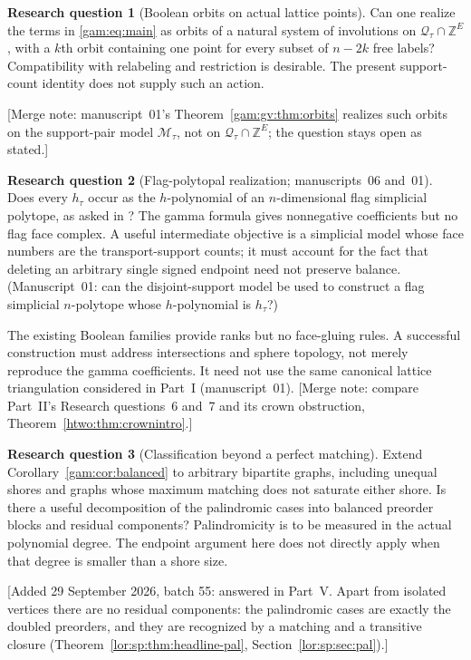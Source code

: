 \documentclass[11pt]{article}
\numberwithin{equation}{section}
\theoremstyle{definition}
\newtheorem{question}{Research question}%
\newcommand{\Z}{\mathbb Z}
\newcommand{\Qt}{\mathcal Q_\tau}
\begin{document}
\begin{question}[Boolean orbits on actual lattice points]\label{gam:q:orbits}
Can one realize the terms in \eqref{gam:eq:main} as orbits of a natural system
of involutions on $\Qt\cap\Z^E$, with a $k$th orbit containing one point
for every subset of $n-2k$ free labels? Compatibility with relabeling and
restriction is desirable. The present support-count identity does not
supply such an action.
\end{question}
[Merge note: manuscript~01's Theorem~\ref{gam:gv:thm:orbits} realizes such
orbits on the support-pair model $\mathscr M_\tau$, not on $\Qt\cap\Z^E$;
the question stays open as stated.]

\begin{question}[Flag-polytopal realization; manuscripts~06 and~01]\label{gam:q:flag}
Does every $h_\tau$ occur as the $h$-polynomial of an $n$-dimensional flag
simplicial polytope, as asked in \cite[Conjecture~5.1(d)]{AC}? The gamma
formula gives nonnegative coefficients but no flag face complex. A useful
intermediate objective is a simplicial model whose face numbers are the
transport-support counts; it must account for the fact that deleting an
arbitrary single signed endpoint need not preserve balance. (Manuscript~01:
can the disjoint-support model be used to construct a flag simplicial
$n$-polytope whose $h$-polynomial is $h_\tau$?)
\end{question}
The existing Boolean families provide ranks but no face-gluing rules.
A successful construction must address intersections and sphere topology,
not merely reproduce the gamma coefficients. It need not use the same
canonical lattice triangulation considered in Part~I (manuscript~01).
[Merge note: compare Part~II's Research questions~6 and~7 and its crown
obstruction, Theorem~\ref{htwo:thm:crownintro}.]

\begin{question}[Classification beyond a perfect matching]\label{lor:hq:beyondpm}%
Extend Corollary~\ref{gam:cor:balanced} to arbitrary bipartite graphs, including
unequal shores and graphs whose maximum matching does not saturate either
shore. Is there a useful decomposition of the palindromic cases into
balanced preorder blocks and residual components? Palindromicity is to be
measured in the actual polynomial degree. The endpoint argument here does
not directly apply when that degree is smaller than a shore size.
\end{question}
[Added 29 September 2026, batch 55: answered in Part~V. Apart from isolated
vertices there are no residual components: the palindromic cases are
exactly the doubled preorders, and they are recognized by a matching and a
transitive closure (Theorem~\ref{lor:sp:thm:headline-pal},
Section~\ref{lor:sp:sec:pal}).]
\end{document}
